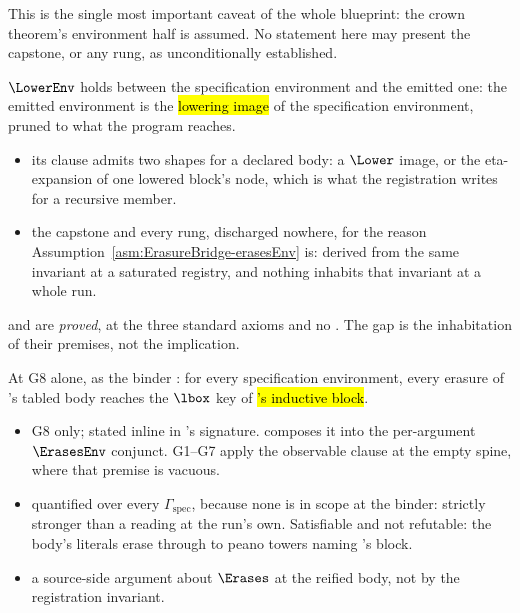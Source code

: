 \begin{remark}
 This is the single most important caveat of the whole blueprint: the crown
theorem's environment half is assumed. No statement here may present the capstone, or any rung, as
unconditionally established.
\end{remark}

\begin{assumption}
\label{asm:ErasureBridge-lowerEnv}
\leanok
{}
\stOpen{}  $\LowerEnv$ holds between the specification environment and the emitted
one: the emitted environment is the \hl{lowering image} of the specification environment, pruned
to what the program reaches.
\begin{itemize}
\item {} its  clause admits two shapes for a declared body: a $\Lower$ image,
or the eta-expansion of one lowered block's node, which is what the registration writes for a
recursive member.
\item {} the capstone and every rung, discharged nowhere, for the reason
Assumption~\ref{asm:ErasureBridge-erasesEnv} is: derived from the same invariant at a saturated
registry, and nothing inhabits that invariant at a whole run.
\end{itemize}
\end{assumption}

\begin{remark}
  and  are
\emph{proved}, at the three standard axioms and no . The gap is the inhabitation of
their premises, not the implication.
\end{remark}

\begin{assumption}
\label{asm:hargReach}
\stAssumed{}  At G8 alone, as the binder : for every specification
environment, every erasure of 's tabled body reaches the $\lbox$ key of
\hl{'s inductive block}.
\begin{itemize}
\item {} G8 only; stated inline in 's signature.
 composes it into the per-argument $\ErasesEnv$ conjunct. G1--G7 apply
the observable clause at the empty spine, where that premise is vacuous.
\item {} quantified over every $\Gamma_{\mathrm{spec}}$, because none is in scope at
the binder: strictly stronger than a reading at the run's own. Satisfiable and not refutable:
the body's literals erase through  to peano towers naming 's block.
\item {} a source-side argument about $\Erases$ at the reified body,
not by the registration invariant.
\end{itemize}
\end{assumption}

